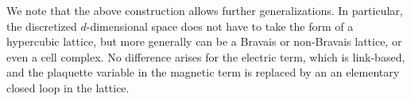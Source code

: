 We note that the above construction allows further generalizations.
In particular, the discretized $d$-dimensional space does not have to take the form of a hypercubic lattice, but more generally can be a Bravais or non-Bravais lattice, or even a cell complex.
No difference arises for the electric term, which is link-based, and the plaquette variable in the magnetic term is replaced by an an elementary closed loop in the lattice.
